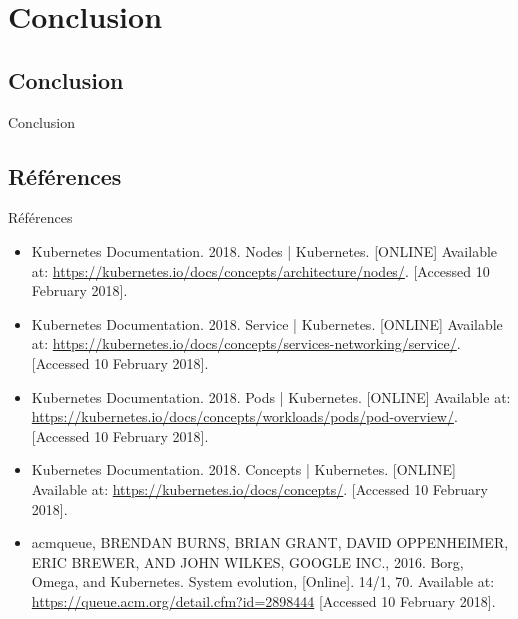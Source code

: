 \documentclass{bredelebeamer}
\begin{document}
\section{Conclusion}
\subsection{Conclusion}
\begin{frame}{Conclusion}

\end{frame}

\subsection{Références}


\begin{frame}{Références}
\begin{itemize}
\item Kubernetes Documentation. 2018. Nodes | Kubernetes. [ONLINE] Available at: \url{https://kubernetes.io/docs/concepts/architecture/nodes/}. [Accessed 10 February 2018].
\item Kubernetes Documentation. 2018. Service | Kubernetes. [ONLINE] Available at: \url{https://kubernetes.io/docs/concepts/services-networking/service/}. [Accessed 10 February 2018].
\item Kubernetes Documentation. 2018. Pods | Kubernetes. [ONLINE] Available at: \url{https://kubernetes.io/docs/concepts/workloads/pods/pod-overview/}. [Accessed 10 February 2018].
\item Kubernetes Documentation. 2018. Concepts | Kubernetes. [ONLINE] Available at: \url{https://kubernetes.io/docs/concepts/}. [Accessed 10 February 2018].
\item acmqueue, BRENDAN BURNS, BRIAN GRANT, DAVID OPPENHEIMER, ERIC BREWER, AND JOHN WILKES, GOOGLE INC., 2016. Borg, Omega, and Kubernetes. System evolution, [Online]. 14/1, 70. Available at: \url{https://queue.acm.org/detail.cfm?id=2898444} [Accessed 10 February 2018].
\end{itemize}
\end{frame}
\end{document}
